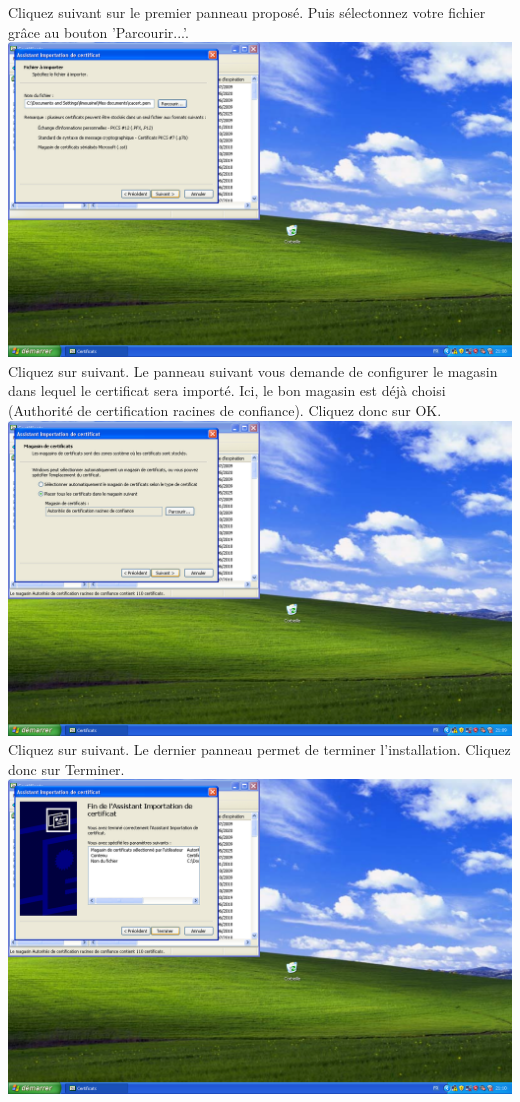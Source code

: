 Cliquez suivant sur le premier panneau proposé. Puis sélectonnez votre fichier grâce au bouton 'Parcourir...'.\\
\includegraphics[width=\screenShotSize{}]{imgUser/importCacertFile.PNG}\\
Cliquez sur suivant. Le panneau suivant vous demande de configurer le magasin dans lequel le certificat sera importé. Ici, le bon magasin est déjà choisi (Authorité de certification racines de confiance). Cliquez donc sur OK.\\
\includegraphics[width=\screenShotSize{}]{imgUser/importCacertStorage.PNG}\\
Cliquez sur suivant. Le dernier panneau permet de terminer l'installation. Cliquez donc sur Terminer.\\
\includegraphics[width=\screenShotSize{}]{imgUser/importCacertFinish.PNG}\\
